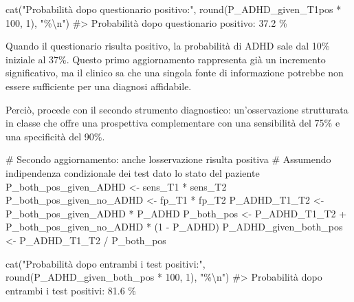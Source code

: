 \documentclass[
  letterpaper,
  DIV=11,
  numbers=noendperiod,
  oneside]{scrreprt}
\newenvironment{Shaded}{\begin{snugshade}}{\end{snugshade}}
\newcommand{\CommentTok}[1]{\textcolor[rgb]{0.37,0.37,0.37}{#1}}
\newcommand{\DecValTok}[1]{\textcolor[rgb]{0.68,0.00,0.00}{#1}}
\newcommand{\FunctionTok}[1]{\textcolor[rgb]{0.28,0.35,0.67}{#1}}
\newcommand{\NormalTok}[1]{\textcolor[rgb]{0.00,0.23,0.31}{#1}}
\newcommand{\OtherTok}[1]{\textcolor[rgb]{0.00,0.23,0.31}{#1}}
\newcommand{\SpecialCharTok}[1]{\textcolor[rgb]{0.37,0.37,0.37}{#1}}
\newcommand{\StringTok}[1]{\textcolor[rgb]{0.13,0.47,0.30}{#1}}
\theoremstyle{definition}
\theoremstyle{plain}
\theoremstyle{definition}
\theoremstyle{remark}
\begin{document}
\begin{tcolorbox}
\begin{Shaded}
\begin{Highlighting}[]
\FunctionTok{cat}\NormalTok{(}\StringTok{"Probabilità dopo questionario positivo:"}\NormalTok{, }\FunctionTok{round}\NormalTok{(P\_ADHD\_given\_T1pos }\SpecialCharTok{*} \DecValTok{100}\NormalTok{, }\DecValTok{1}\NormalTok{), }\StringTok{"\%}\SpecialCharTok{\textbackslash{}n}\StringTok{"}\NormalTok{)}
\CommentTok{\#\textgreater{} Probabilità dopo questionario positivo: 37.2 \%}
\end{Highlighting}
\end{Shaded}

Quando il questionario risulta positivo, la probabilità di ADHD sale dal
10\% iniziale al 37\%. Questo primo aggiornamento rappresenta già un
incremento significativo, ma il clinico sa che una singola fonte di
informazione potrebbe non essere sufficiente per una diagnosi
affidabile.

Perciò, procede con il secondo strumento diagnostico: un'osservazione
strutturata in classe che offre una prospettiva complementare con una
sensibilità del 75\% e una specificità del 90\%.

\begin{Shaded}
\begin{Highlighting}[]
\CommentTok{\# Secondo aggiornamento: anche l\textquotesingle{}osservazione risulta positiva}
\CommentTok{\# Assumendo indipendenza condizionale dei test dato lo stato del paziente}
\NormalTok{P\_both\_pos\_given\_ADHD }\OtherTok{\textless{}{-}}\NormalTok{ sens\_T1 }\SpecialCharTok{*}\NormalTok{ sens\_T2}
\NormalTok{P\_both\_pos\_given\_no\_ADHD }\OtherTok{\textless{}{-}}\NormalTok{ fp\_T1 }\SpecialCharTok{*}\NormalTok{ fp\_T2}
\NormalTok{P\_ADHD\_T1\_T2 }\OtherTok{\textless{}{-}}\NormalTok{ P\_both\_pos\_given\_ADHD }\SpecialCharTok{*}\NormalTok{ P\_ADHD}
\NormalTok{P\_both\_pos }\OtherTok{\textless{}{-}}\NormalTok{ P\_ADHD\_T1\_T2 }\SpecialCharTok{+}\NormalTok{ P\_both\_pos\_given\_no\_ADHD }\SpecialCharTok{*}\NormalTok{ (}\DecValTok{1} \SpecialCharTok{{-}}\NormalTok{ P\_ADHD)}
\NormalTok{P\_ADHD\_given\_both\_pos }\OtherTok{\textless{}{-}}\NormalTok{ P\_ADHD\_T1\_T2 }\SpecialCharTok{/}\NormalTok{ P\_both\_pos}

\FunctionTok{cat}\NormalTok{(}\StringTok{"Probabilità dopo entrambi i test positivi:"}\NormalTok{, }\FunctionTok{round}\NormalTok{(P\_ADHD\_given\_both\_pos }\SpecialCharTok{*} \DecValTok{100}\NormalTok{, }\DecValTok{1}\NormalTok{), }\StringTok{"\%}\SpecialCharTok{\textbackslash{}n}\StringTok{"}\NormalTok{)}
\CommentTok{\#\textgreater{} Probabilità dopo entrambi i test positivi: 81.6 \%}
\end{Highlighting}
\end{Shaded}


\end{tcolorbox}
\end{document}
